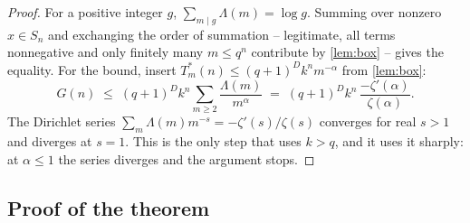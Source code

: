 \documentclass[11pt]{amsart}
\theoremstyle{definition}
\theoremstyle{remark}
\begin{document}
\begin{proof}
For a positive integer $g$, $\sum_{m \mid g}\Lambda(m) = \log g$. Summing over nonzero $x \in S_n$ and exchanging the order of summation -- legitimate, all terms nonnegative and only finitely many $m \le q^{n}$ contribute by \cref{lem:box} -- gives the equality. For the bound, insert $T^{*}_m(n) \le (q+1)^{D}k^{n}m^{-\alpha}$ from \cref{lem:box}:
\[
  G(n) \;\le\; (q+1)^{D}k^{n}\sum_{m\ge2}\frac{\Lambda(m)}{m^{\alpha}} \;=\; (q+1)^{D}k^{n}\,\frac{-\zeta'(\alpha)}{\zeta(\alpha)} .
\]
The Dirichlet series $\sum_m \Lambda(m)m^{-s} = -\zeta'(s)/\zeta(s)$ converges for real $s>1$ and diverges at $s=1$. This is the only step that uses $k>q$, and it uses it sharply: at $\alpha \le 1$ the series diverges and the argument stops.
\end{proof}

\subsection{Proof of the theorem}
\end{document}
